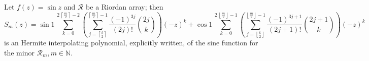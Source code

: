 
\begin{theorem}
\label{thm:sin-Hermite-interpolating-polys}
Let $f(z)=\sin{z}$ and $\mathcal{R}$ be a Riordan array; then 
\begin{equation}
  \label{eq:sin-Hermite-interpolating-poly}
  S_{m}(z) = \sin{1}\,\sum_{k=0}^{2\,\left\lceil \frac{m}{2} \right\rceil-2}{\left(\sum_{j=\left\lceil \frac{k}{2}\right\rceil}^{\left\lceil \frac{m}{2} \right\rceil -1}{\frac{(-1)^{3j}}{(2j)!}{2j\choose k}}\right) {(-z)^{k}}}
       + \cos{1}\,\sum_{k=0}^{2\,\left\lfloor \frac{m}{2} \right\rfloor-1}{\left(\sum_{j=\left\lfloor \frac{k}{2}\right\rfloor}^{\left\lfloor \frac{m}{2} \right\rfloor -1}{\frac{(-1)^{3j+1}}{(2j + 1)!} {2j+1\choose k}}\right){(-z)^{k}}}
\end{equation}
is an Hermite interpolating polynomial, explicitly written, of the sine
function for the minor $\mathcal{R}_{m}, m\in\mathbb{N}$.
\end{theorem}

